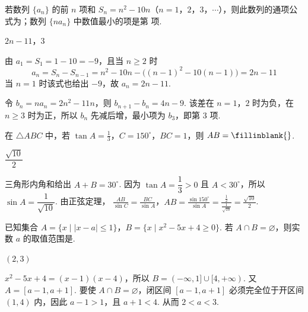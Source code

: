 \begin{problem}
若数列 \( \{a_{n}\} \) 的前 \(n\) 项和 \(S_{n}=n^{2}-10n\)（\(n=1\)，\(2\)，\(3\)，\(\cdots\)），则此数列的通项公式为\fillinblank{}；数列 \( \{na_{n}\} \) 中数值最小的项是第\fillinblank{} 项.
\end{problem}

\begin{answer}
\(2n-11\)，\(3\)
\end{answer}

\begin{solution}
由 \(a_1=S_1=1-10=-9\)，且当 \(n\geqslant2\) 时
\[
a_n=S_n-S_{n-1}=n^2-10n-\bigl((n-1)^2-10(n-1)\bigr)=2n-11
\]
当 \(n=1\) 时该式也给出 \(-9\)，故 \(a_n=2n-11\).

令 \(b_n=na_n=2n^2-11n\)，则
\(b_{n+1}-b_n=4n-9\). 该差在 \(n=1\)，\(2\) 时为负，在 \(n\geqslant3\) 时为正，所以 \(b_n\) 先减后增，最小项为 \(b_3\)，即第 3 项.
\end{solution}

\begin{problem}
在 \(\triangle ABC\) 中，若 \(\tan A = \frac{1}{3}\)，\(C = 150^{\circ}\)，\(BC = 1\)，则 \(AB =\fillinblank{}\).
\end{problem}

\begin{answer}
\(\dfrac{\sqrt{10}}{2}\)
\end{answer}

\begin{solution}
三角形内角和给出 \(A+B=30^\circ\). 因为 \(\tan A=\dfrac13>0\) 且 \(A<30^\circ\)，所以
\(\sin A=\dfrac1{\sqrt{10}}\).
由正弦定理，
\(\frac{AB}{\sin C}=\frac{BC}{\sin A}\)，\(AB=\frac{\sin150^\circ}{\sin A} =\frac{\frac{1}{2}}{\frac{1}{\sqrt{10}}}=\frac{\sqrt{10}}2\).
\end{solution}

\begin{problem}
已知集合 \(A = \{x \mid |x - a| \leqslant 1\}\)，\(B = \{x \mid x^2 - 5x + 4 \geqslant 0\}\). 若 \(A \cap B = \varnothing\)，则实数 \(a\) 的取值范围是\fillinblank{}.
\end{problem}

\begin{answer}
\((2,3)\)
\end{answer}

\begin{solution}
\(x^2-5x+4=(x-1)(x-4)\)，所以
\(B=(-\infty,1]\cup[4,+\infty)\). 又 \(A=[a-1,a+1]\).
要使 \(A\cap B=\varnothing\)，闭区间 \([a-1,a+1]\) 必须完全位于开区间 \((1,4)\) 内，因此
\(a-1>1\)，且 \(a+1<4\). 从而 \(2<a<3\).
\end{solution}

